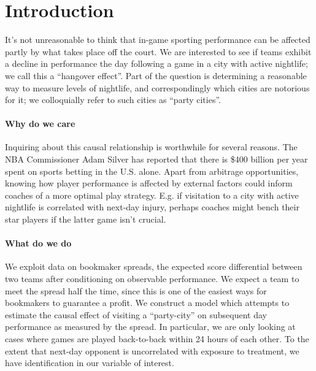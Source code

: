 \documentclass[letterpaper,12pt]{article}
\begin{document}

\section{Introduction}
It's not unreasonable to think that in-game sporting performance can be affected 
partly by what takes place off the court. 
We are interested to see if 
teams exhibit a decline in performance the day following a game in a city 
with active nightlife; we call this a ``hangover effect''.
Part of the question is determining a reasonable way to measure
levels of nightlife, and correspondingly which cities are notorious for it; we colloquially
refer to such cities as ``party cities''.

\paragraph{Why do we care} 
Inquiring about this causal relationship is worthwhile for several reasons. The
NBA Commissioner Adam Silver has reported that there is \$400 billion per year spent 
on sports betting in the U.S. alone.\citep{asilver,cnnsilver} Apart from arbitrage opportunities,
knowing how player performance is affected by external factors could inform coaches of a more
optimal play strategy. E.g. if visitation to a city with active nightlife is correlated with
next-day injury, perhaps coaches might bench their star players if the latter game isn't crucial.

\paragraph{What do we do}
We exploit data on bookmaker spreads, the expected score 
differential between two teams after conditioning on observable performance. 
We expect a team to meet the spread half the time, since this is one of the easiest ways for 
bookmakers to guarantee a profit.\citep{dubnerlevitt} We construct a model which attempts to 
estimate the causal effect of  visiting a ``party-city'' on subsequent day 
performance as measured by the spread. In particular, we are only looking at
cases where games are played back-to-back within 24 hours of each other.
To the extent that next-day opponent is uncorrelated with exposure to treatment, 
we have identification in our variable of interest.
\end{document}
